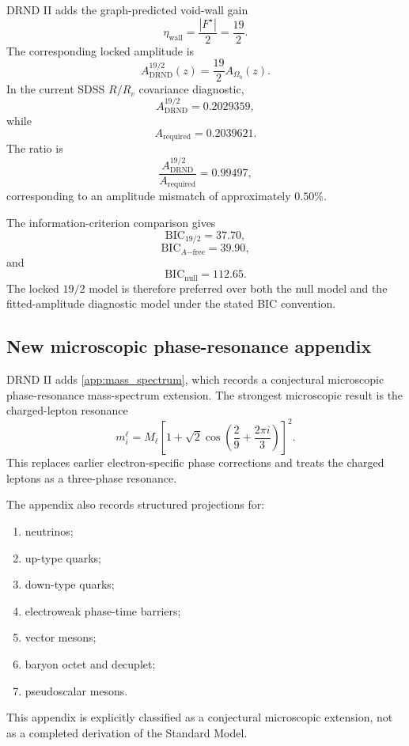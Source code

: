 \documentclass[12pt]{iopart}
\begin{document}
DRND II adds the graph-predicted void-wall gain
\begin{equation}
\eta_{\mathrm{wall}}
=
\frac{|F^\star|}{2}
=
\frac{19}{2}.
\end{equation}
The corresponding locked amplitude is
\begin{equation}
A_{\mathrm{DRND}}^{19/2}(z)
=
\frac{19}{2}A_{\Omega_b}(z).
\end{equation}
In the current SDSS \(R/R_v\) covariance diagnostic,
\begin{equation}
A_{\mathrm{DRND}}^{19/2}=0.2029359,
\end{equation}
while
\begin{equation}
A_{\mathrm{required}}=0.2039621.
\end{equation}
The ratio is
\begin{equation}
\frac{
A_{\mathrm{DRND}}^{19/2}
}{
A_{\mathrm{required}}
}
=
0.99497,
\end{equation}
corresponding to an amplitude mismatch of approximately \(0.50\%\).

The information-criterion comparison gives
\begin{equation}
\mathrm{BIC}_{19/2}=37.70,
\end{equation}
\begin{equation}
\mathrm{BIC}_{A\mathrm{-free}}=39.90,
\end{equation}
and
\begin{equation}
\mathrm{BIC}_{\mathrm{null}}=112.65.
\end{equation}
The locked \(19/2\) model is therefore preferred over both the null model and the fitted-amplitude diagnostic model under the stated BIC convention.

\subsection{New microscopic phase-resonance appendix}

DRND II adds \ref{app:mass_spectrum}, which records a conjectural microscopic phase-resonance mass-spectrum extension. The strongest microscopic result is the charged-lepton resonance
\begin{equation}
m_i^\ell
=
M_\ell
\left[
1+\sqrt{2}\cos\left(
\frac{2}{9}
+
\frac{2\pi i}{3}
\right)
\right]^2.
\end{equation}
This replaces earlier electron-specific phase corrections and treats the charged leptons as a three-phase resonance.

The appendix also records structured projections for:
\begin{enumerate}
    \item neutrinos;
    \item up-type quarks;
    \item down-type quarks;
    \item electroweak phase-time barriers;
    \item vector mesons;
    \item baryon octet and decuplet;
    \item pseudoscalar mesons.
\end{enumerate}
This appendix is explicitly classified as a conjectural microscopic extension, not as a completed derivation of the Standard Model.
\end{document}
